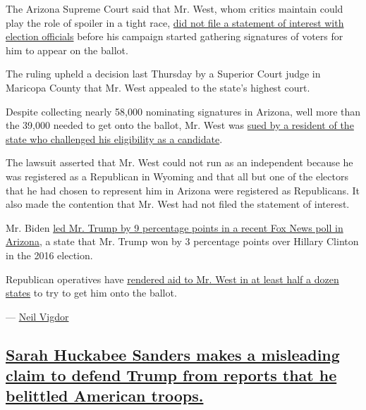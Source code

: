 The Arizona Supreme Court said that Mr. West, whom critics maintain
could play the role of spoiler in a tight race,
\href{https://arizonaslaw.blogspot.com/2020/09/breaking-kanye-loses-arizona-supreme.html}{did
not file a statement of interest with election officials} before his
campaign started gathering signatures of voters for him to appear on the
ballot.

The ruling upheld a decision last Thursday by a Superior Court judge in
Maricopa County that Mr. West appealed to the state's highest court.

Despite collecting nearly 58,000 nominating signatures in Arizona, well
more than the 39,000 needed to get onto the ballot, Mr. West was
\href{https://www.fox6now.com/news/lawsuit-seeks-to-ban-kanye-west-from-appearing-on-arizona-ballot-for-president}{sued
by a resident of the state who challenged his eligibility as a
candidate}.

The lawsuit asserted that Mr. West could not run as an independent
because he was registered as a Republican in Wyoming and that all but
one of the electors that he had chosen to represent him in Arizona were
registered as Republicans. It also made the contention that Mr. West had
not filed the statement of interest.

Mr. Biden
\href{https://www.nytimes3xbfgragh.onion/2020/09/03/us/politics/biden-trump-polling.html}{led
Mr. Trump by 9 percentage points in a recent Fox News poll in Arizona},
a state that Mr. Trump won by 3 percentage points over Hillary Clinton
in the 2016 election.

Republican operatives have
\href{https://www.nytimes3xbfgragh.onion/2020/08/04/us/politics/kanye-west-president-republicans.html}{rendered
aid to Mr. West in at least half a dozen states} to try to get him onto
the ballot.

--- \href{https://www.nytimes3xbfgragh.onion/by/neil-vigdor}{Neil
Vigdor}

\hypertarget{sarah-huckabee-sanders-makes-a-misleading-claim-to-defend-trump-from-reports-that-he-belittled-american-troops}{%
\subsection{\texorpdfstring{\protect\hyperlink{sarah-huckabee-sanders-makes-a-misleading-claim-to-defend-trump-from-reports-that-he-belittled-american-troops}{Sarah
Huckabee Sanders makes a misleading claim to defend Trump from reports
that he belittled American
troops.}}{Sarah Huckabee Sanders makes a misleading claim to defend Trump from reports that he belittled American troops.}}\label{sarah-huckabee-sanders-makes-a-misleading-claim-to-defend-trump-from-reports-that-he-belittled-american-troops}}

